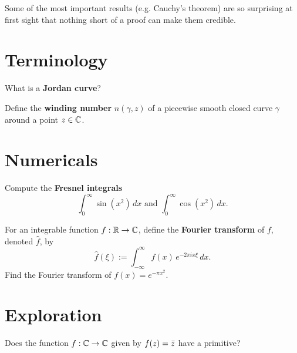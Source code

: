 \documentclass{homework}
\author{Jim Fowler}
\begin{document}
\maketitle

\begin{inspiration}
Some of the most important results (e.g. Cauchy's theorem) are so surprising at first sight that nothing short of a proof can make them credible.
\end{inspiration}

\section{Terminology}

\begin{problem}
  What is a \textbf{Jordan curve}?
\end{problem}

\begin{problem}
  Define the \textbf{winding number} $n(\gamma,z)$ of a piecewise
  smooth closed curve $\gamma$ around a point $z \in \mathbb{C}$.
\end{problem}

\section{Numericals}

\begin{problem} Compute the \textbf{Fresnel integrals}
  \[
    \int_0^\infty \sin \left( x^2 \right) \, dx \mbox{ and } \int_0^\infty \cos \left( x^2 \right) \, dx.
  \]
\end{problem}

\begin{problem}
  For an integrable function $f : \mathbb{R} \to \mathbb{C}$, define the
  \textbf{Fourier transform} of $f$, denoted $\hat{f}$, by
  \[
    {\hat {f}}(\xi ) := \int _{-\infty }^{\infty} f(x) \, e^{-2\pi ix \xi} \,dx.
  \]
  Find the Fourier transform of $f(x) = e^{-\pi x^2}$.
\end{problem}

\section{Exploration}

\begin{problem}
  Does the function $f : \mathbb{C} \to \mathbb{C}$ given by $f(z) = \bar{z}$ have a
  primitive?
\end{problem}
\end{document}

